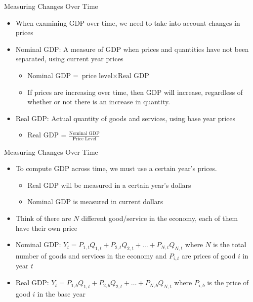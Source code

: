 \documentclass[aspectratio=1610]{beamer}
\begin{document}
\begin{frame}[wide]{Measuring Changes Over Time}
	\begin{itemize}
		\item When examining GDP over time, we need to take into account changes in prices
		\item Nominal GDP: 	A measure of GDP when prices and quantities have not been separated, using current year prices
		\begin{itemize}
			\item Nominal GDP = $\mbox{price level} \times \mbox{Real GDP}$
			\item If prices are increasing over time, then GDP will increase, regardless of whether or not there is an increase in quantity.
			
		\end{itemize}
		\item Real GDP: Actual quantity of goods and services, using base year prices
		\begin{itemize}
			\item Real GDP = $\frac{\mbox{Nominal GDP}}{\mbox{Price Level}}$
		\end{itemize}
	\end{itemize}
\end{frame}

\begin{frame}[wide]{Measuring Changes Over Time}
	\begin{itemize}
	\item To compute GDP across time, we must use a certain year’s prices.
	\begin{itemize}
		\item 	Real GDP will be measured in a certain year’s dollars
		\item Nominal GDP is measured in current dollars
	\end{itemize}
	\item Think of there are $N$ different good/service in the economy, each of them have their own price
	\item Nominal GDP: $Y_t= P_{1,t} Q_{1,t} + P_{2,t} Q_{2,t} + \dots + P_{N,t} Q_{N,t}$
	where $N$ is the total number of goods and services in the economy and $P_{i,t} $ are prices of good $i$ in year $t$
	\item Real GDP: $Y_t = P_{1,b} Q_{1,t} + P_{2,b} Q_{2,t} + \dots + P_{N,b} Q_{N,t}$
	where $P_{i,b}$ is the price of good $i$ in the base year
	\end{itemize}
\end{frame}
\end{document}
